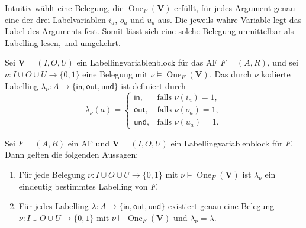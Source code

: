 Intuitiv wählt eine Belegung, die \(\operatorname{One}_F(\mathbf V)\) erfüllt, 
für jedes Argument genau eine der drei Labelvariablen \(i_a\), \(o_a\) und \(u_a\) aus. 
Die jeweils wahre Variable legt das Label des Arguments fest. 
Somit lässt sich eine solche Belegung unmittelbar als Labelling lesen, und umgekehrt.
\begin{Definition}
    \label{def:One-model}
    Sei \(\mathbf V=(I,O,U)\) ein Labellingvariablenblock für das AF
    \(F=(A,R)\), und sei
    \(\nu\colon I\cup O\cup U\to\{0,1\}\) eine Belegung mit
    \(\nu\models\operatorname{One}_F(\mathbf V)\).
    Das durch \(\nu\) kodierte Labelling
    \(\lambda_\nu\colon A\to
    \{\mathsf{in},\mathsf{out},\mathsf{und}\}\) ist definiert durch
    \[
        \lambda_\nu(a)=
        \begin{cases}
            \mathsf{in},
                &\text{falls }\nu(i_a)=1,\\
            \mathsf{out},
                &\text{falls }\nu(o_a)=1,\\
            \mathsf{und},
                &\text{falls }\nu(u_a)=1.
        \end{cases}
    \]
\end{Definition}

\begin{Lemma}
    \label{lem:One-model}
    Sei \(F=(A,R)\) ein AF und
    \(\mathbf V=(I,O,U)\) ein Labellingvariablenblock für \(F\).
    Dann gelten die folgenden Aussagen:
    \begin{enumerate}
        \item Für jede Belegung
        \(\nu\colon I\cup O\cup U\to\{0,1\}\)
        mit
        \(\nu\models\operatorname{One}_F(\mathbf V)\)
        ist \(\lambda_\nu\) ein eindeutig bestimmtes Labelling
        von \(F\).

        \item Für jedes Labelling
        \(\lambda\colon A\to
        \{\mathsf{in},\mathsf{out},\mathsf{und}\}\)
        existiert genau eine Belegung
        \(\nu\colon I\cup O\cup U\to\{0,1\}\)
        mit
        \(\nu\models\operatorname{One}_F(\mathbf V)\)
        und
        \(\lambda_\nu=\lambda\).
    \end{enumerate}
\end{Lemma}

